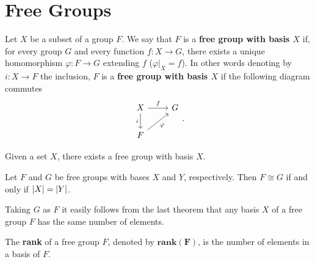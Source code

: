 \section{Free Groups}

\begin{definition}
    Let $X$ be a subset of a group $F$. We say that $F$ is a \textbf{free group with basis $X$} if, for every group $G$ and every function $f \colon X \rightarrow G$, there exists a unique homomorphism $\varphi \colon F \rightarrow G$ extending $f$ ($\varphi |_X = f$). In other words denoting by $i \colon X \rightarrow F$ the inclusion, $F$ is a \textbf{free group with basis $X$} if the following diagram commutes 
    \[\begin{tikzcd}
        X & G \\
        F
        \arrow["f", from=1-1, to=1-2]
        \arrow["i"', from=1-1, to=2-1]
        \arrow["\varphi"', from=2-1, to=1-2]
    \end{tikzcd}.\]
\end{definition}

\begin{theorem}
    \cite[p.~344]{RotmanITG}
    Given a set $X$, there exists a free group with basis $X$.
\end{theorem}

\begin{theorem}
    \cite[p.~348]{RotmanITG}
    Let $F$ and $G$ be free groups with bases $X$ and $Y$, respectively. 
    Then $F \cong G$ if and only if $| X | = | Y |$. 
\end{theorem}

Taking $G$ as $F$ it easily follows from the last theorem that any basis $X$ of a free group $F$ has the same number of elements.

\begin{definition}
    The \textbf{rank} of a free group $F$, denoted by $\mathbf{rank(F)}$, is the number of elements in a basis of $F$. 
\end{definition}